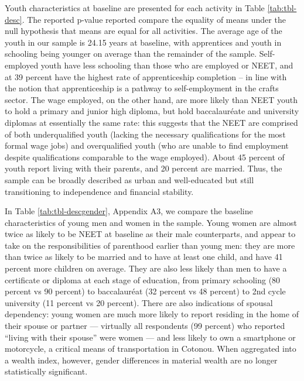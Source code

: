 \documentclass[
  a4paper, twoside, 12pt]{book}
\begin{document}
Youth characteristics at baseline are presented for each activity in Table \ref{tab:tbl-desc}. The reported p-value reported compare the equality of means under the null hypothesis that means are equal for all activities. The average age of the youth in our sample is 24.15 years at baseline, with apprentices and youth in schooling being younger on average than the remainder of the sample. Self-employed youth have less schooling than those who are employed or NEET, and at 39 percent have the highest rate of apprenticeship completion -- in line with the notion that apprenticeship is a pathway to self-employment in the crafts sector. The wage employed, on the other hand, are more likely than NEET youth to hold a primary and junior high diploma, but hold baccalauréate and university diplomas at essentially the same rate: this suggests that the NEET are comprised of both underqualified youth (lacking the necessary qualifications for the most formal wage jobs) and overqualified youth (who are unable to find employment despite qualifications comparable to the wage employed). About 45 percent of youth report living with their parents, and 20 percent are married. Thus, the sample can be broadly described as urban and well-educated but still transitioning to independence and financial stability.

In Table \ref{tab:tbl-descgender}, Appendix A3, we compare the baseline characteristics of young men and women in the sample. Young women are almost twice as likely to be NEET at baseline as their male counterparts, and appear to take on the responsibilities of parenthood earlier than young men: they are more than twice as likely to be married and to have at least one child, and have 41 percent more children on average. They are also less likely than men to have a certificate or diploma at each stage of education, from primary schooling (80 percent vs 90 percent) to baccalauréat (32 percent vs 48 percent) to 2nd cycle university (11 percent vs 20 percent). There are also indications of spousal dependency: young women are much more likely to report residing in the home of their spouse or partner --- virtually all respondents (99 percent) who reported ``living with their spouse'' were women --- and less likely to own a smartphone or motorcycle, a critical means of transportation in Cotonou. When aggregated into a wealth index, however, gender differences in material wealth are no longer statistically significant.
\end{document}
